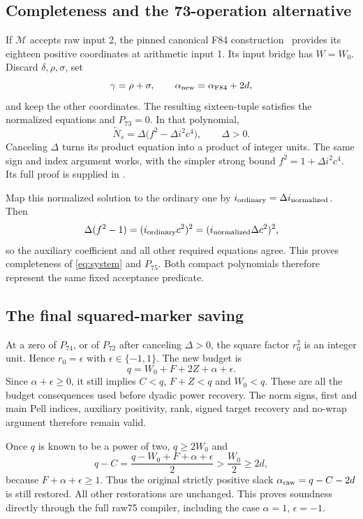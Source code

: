 \documentclass[11pt,a4paper]{article}
\theoremstyle{definition}\newtheorem{definition}[theorem]{Definition}
\newcommand{\file}[1]{\texttt{\detokenize{#1}}}
\begin{document}
\subsection{Completeness and the 73-operation alternative}
If $\mathcal M$ accepts raw input 2, the pinned canonical F84
construction~\cite{f84} provides its eighteen positive coordinates at
arithmetic input 1. Its input bridge has $W=W_0$.
Discard $\delta,\rho,\sigma$, set
\[
 \gamma=\rho+\sigma,\qquad
 \alpha_{\rm new}=\alpha_{\rm F84}+2d,
\]
and keep the other coordinates. The resulting sixteen-tuple satisfies
the normalized equations and $P_{73}=0$. In that polynomial,
\[
 \widetilde N_s=\Delta
       \bigl(f^2-\Delta i^2c^4\bigr),\qquad \Delta>0.
\]
Canceling $\Delta$ turns its product equation into a product of integer
units. The same sign and index argument works, with the simpler strong
bound $f^2=1+\Delta i^2c^4$. Its full proof is supplied in
\file{FIXED_INPUT73_PROOF.md}.

Map this normalized solution to the ordinary one by
$i_{\rm ordinary}=\Delta i_{\rm normalized}$. Then
\[
 \Delta(f^2-1)=(i_{\rm ordinary}c^2)^2
              =(i_{\rm normalized}\Delta c^2)^2,
\]
so the auxiliary coefficient and all other required equations agree.
This proves completeness of \eqref{eq:system} and $P_{75}$.
Both compact polynomials therefore represent the same fixed
acceptance predicate.

\subsection{The final squared-marker saving}\label{sec:squaremarker}
At a zero of $P_{74}$, or of $P_{72}$ after canceling $\Delta>0$,
the square factor $r_0^2$ is an integer unit. Hence $r_0=\epsilon$
with $\epsilon\in\{-1,1\}$. The new budget is
\[
 q=W_0+F+2Z+\alpha+\epsilon.
\]
Since $\alpha+\epsilon\ge0$, it still implies $C<q$, $F+Z<q$
and $W_0<q$. These are all the budget consequences used before
dyadic power recovery. The norm signs, first and main Pell indices,
auxiliary positivity, rank, signed target recovery and no-wrap
argument therefore remain valid.

Once $q$ is known to be a power of two, $q\ge2W_0$ and
\[
 q-C=\frac{q-W_0+F+\alpha+\epsilon}{2}
      >\frac{W_0}{2}\ge2d,
\]
because $F+\alpha+\epsilon\ge1$. Thus the original strictly
positive slack $\alpha_{\rm raw}=q-C-2d$ is still restored.
All other restorations are unchanged. This proves soundness directly
through the full raw75 compiler, including the case
$\alpha=1$, $\epsilon=-1$.
\end{document}
